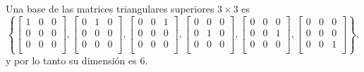 \begin{enumerate}[resume, topsep=6pt, itemsep=.4cm]
    Una base de las matrices triangulares superiores $3\times 3$ es
    $$
    \left\{  \begin{bmatrix} 1 & 0 & 0 \\ 0 & 0 & 0 \\ 0 & 0 & 0 \\ \end{bmatrix}, 
    \begin{bmatrix} 0 & 1 & 0 \\ 0 & 0 & 0 \\ 0 & 0 & 0 \\ \end{bmatrix}, 
    \begin{bmatrix} 0 & 0 & 1 \\ 0 & 0 & 0 \\ 0 & 0 & 0 \\ \end{bmatrix}, 
    \begin{bmatrix} 0 & 0 & 0 \\ 0 & 1 & 0 \\ 0 & 0 & 0 \\ \end{bmatrix}, 
    \begin{bmatrix} 0 & 0 & 0 \\ 0 & 0 & 1 \\ 0 & 0 & 0 \\ \end{bmatrix}, 
    \begin{bmatrix} 0 & 0 & 0 \\ 0 & 0 & 0 \\ 0 & 0 & 1 \\ \end{bmatrix} \right\},
    $$
    y por lo tanto su dimensión es $6$.



\end{enumerate}
